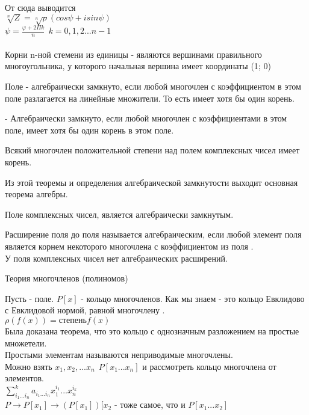 От сюда выводится  \\
$\sqrt[n]{Z} = \sqrt[n]{\rho} (cos\psi + isin\psi)$ \\
$\psi = \frac {\varphi + 2\Pi k}{n} ~~ k = 0, 1, 2 ... n -1$ \\

 \\
Корни n-ной стемени из единицы - являются вершинами
правильного многоугольника, у которого начальная вершина
имеет координаты (1; 0) \\

\begin{defin}
	Поле  - алгебраически замкнуто, если любой многочлен с
	коэффициентом в этом поле разлагается на линейные множители.
          То есть имеет хотя бы один корень.
\end{defin}

\begin{defin}
	 - Алгебраически замкнуто, если любой многочлен с коэффициентами в этом
	поле, имеет хотя бы один корень в этом поле.
\end{defin}

\begin{theorem}
           Всякий многочлен положительной степени над полем комплексных чисел имеет корень.
\end{theorem}

Из этой теоремы и определения алгебраической замкнутости выходит основная теорема алгебры.\\
\begin{theorem}
	Поле комплексных чисел, является алгебраически замкнутым.
\end{theorem}

\begin{defin}
	Расширение поля  до поля  называется алгебраическим, если любой
	элемент поля  является корнем некоторого многочлена с коэффициентом из
	поля .\\
	У поля комплексных чисел нет алгебраических расширений.
\end{defin}

\begin{title}
	Теория многочленов (полиномов)
\end{title}

Пусть  - поле. $P[x]$ - кольцо многочленов. Как мы знаем - это кольцо
Евклидово с Евклидовой нормой, равной многочлену . \\
$\rho (f(x)) = степень f(x)$ \\
Была доказана теорема, что это кольцо с однозначным разложением на простые
множетели. \\
Простыми элементам называются неприводимые многочлены. \\
Можно взять $x_{1}, x_{2}, ... x_{n} ~~ P[x_{1} ... x_{n}]$ и рассмотреть кольцо
многочлена от  элементов. \\
$\sum_{i_{1}...i_{n}}^k a_{i_{1}...i_{n}} x_{1}^{i_{1}} ... x_{n}^{i_{k}}$ \\
$P \to P[x_{1}] \to (P[x_{1}])[x_{2}$ - тоже самое, что и $P[x_{1} ... x_{2}]$\\

